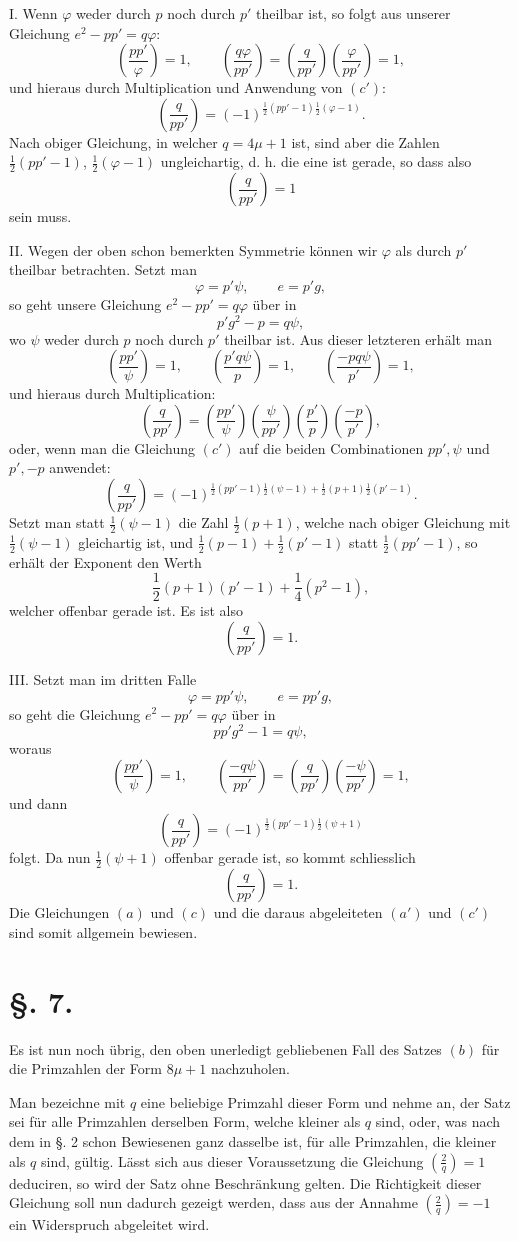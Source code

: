 \documentclass[11pt]{article}
\newcommand{\J}[2]{\left(\frac{#1}{#2}\right)}
\begin{document}
I. Wenn $\varphi$ weder durch $p$ noch durch $p'$ theilbar ist, so folgt aus unserer Gleichung $e^2-pp'=q\varphi$:
\[
 \J{pp'}{\varphi}=1,
\qquad
 \J{q\varphi}{pp'}=\J{q}{pp'}\J{\varphi}{pp'}=1,
\]
und hieraus durch Multiplication und Anwendung von $(c')$:
\[
 \J{q}{pp'}=(-1)^{\frac12(pp'-1)\frac12(\varphi-1)}.
\]
Nach obiger Gleichung, in welcher $q=4\mu+1$ ist, sind aber die Zahlen $\frac12(pp'-1)$, $\frac12(\varphi-1)$ ungleichartig, d. h. die eine ist gerade, so dass also
\[
 \J{q}{pp'}=1
\]
sein muss.

II. Wegen der oben schon bemerkten Symmetrie können wir $\varphi$ als durch $p'$ theilbar betrachten. Setzt man
\[
 \varphi=p'\psi,
\qquad e=p'g,
\]
so geht unsere Gleichung $e^2-pp'=q\varphi$ über in
\[
 p'g^2-p=q\psi,
\]
wo $\psi$ weder durch $p$ noch durch $p'$ theilbar ist. Aus dieser letzteren erhält man
\[
 \J{pp'}{\psi}=1,
\qquad
 \J{p'q\psi}{p}=1,
\qquad
 \J{-p q\psi}{p'}=1,
\]
und hieraus durch Multiplication:
\[
 \J{q}{pp'}=\J{pp'}{\psi}\J{\psi}{pp'}\J{p'}{p}\J{-p}{p'},
\]
oder, wenn man die Gleichung $(c')$ auf die beiden Combinationen $pp',\psi$ und $p',-p$ anwendet:
\[
 \J{q}{pp'}=(-1)^{\frac12(pp'-1)\frac12(\psi-1)+\frac12(p+1)\frac12(p'-1)}.
\]
Setzt man statt $\frac12(\psi-1)$ die Zahl $\frac12(p+1)$, welche nach obiger Gleichung mit $\frac12(\psi-1)$ gleichartig ist, und $\frac12(p-1)+\frac12(p'-1)$ statt $\frac12(pp'-1)$, so erhält der Exponent den Werth
\[
 \frac12(p+1)(p'-1)+\frac14(p^2-1),
\]
welcher offenbar gerade ist. Es ist also
\[
 \J{q}{pp'}=1.
\]

III. Setzt man im dritten Falle
\[
 \varphi=pp'\psi,
\qquad e=pp'g,
\]
so geht die Gleichung $e^2-pp'=q\varphi$ über in
\[
 pp'g^2-1=q\psi,
\]
woraus
\[
 \J{pp'}{\psi}=1,
\qquad
 \J{-q\psi}{pp'}=\J{q}{pp'}\J{-\psi}{pp'}=1,
\]
und dann
\[
 \J{q}{pp'}=(-1)^{\frac12(pp'-1)\frac12(\psi+1)}
\]
folgt. Da nun $\frac12(\psi+1)$ offenbar gerade ist, so kommt schliesslich
\[
 \J{q}{pp'}=1.
\]
Die Gleichungen $(a)$ und $(c)$ und die daraus abgeleiteten $(a')$ und $(c')$ sind somit allgemein bewiesen.

\section*{\S. 7.}

Es ist nun noch übrig, den oben unerledigt gebliebenen Fall des Satzes $(b)$ für die Primzahlen der Form $8\mu+1$ nachzuholen.

Man bezeichne mit $q$ eine beliebige Primzahl dieser Form und nehme an, der Satz sei für alle Primzahlen derselben Form, welche kleiner als $q$ sind, oder, was nach dem in \S. 2 schon Bewiesenen ganz dasselbe ist, für alle Primzahlen, die kleiner als $q$ sind, gültig. Lässt sich aus dieser Voraussetzung die Gleichung $\J{2}{q}=1$ deduciren, so wird der Satz ohne Beschränkung gelten. Die Richtigkeit dieser Gleichung soll nun dadurch gezeigt werden, dass aus der Annahme $\J{2}{q}=-1$ ein Widerspruch abgeleitet wird.
\end{document}
